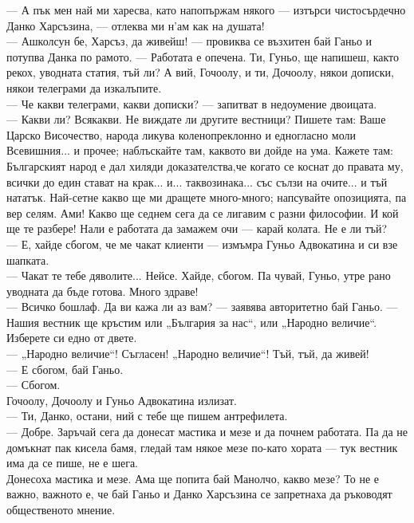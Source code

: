 \documentclass[12pt,a4paper]{article}
\begin{document}
    — А пък мен най ми харесва, като напопържам някого — изтърси чистосърдечно Данко Харсъзина, — отлеква ми н’ам как на душата!\\
    — Ашколсун бе, Харсъз, да живейш! — провиква се възхитен бай Ганьо и потупва Данка по рамото. — Работата е опечена. Ти, Гуньо, ще напишеш, както рекох, уводната статия, тъй ли? А вий, Гочоолу, и ти, Дочоолу, някои дописки, някои телеграми да изкалъпите.\\
    — Че какви телеграми, какви дописки? — запитват в недоумение двоицата.\\
    — Какви ли? Всякакви. Не виждате ли другите вестници? Пишете там: Ваше Царско Височество, народа ликува коленопреклонно и едногласно моли Всевишния... и прочее; наблъскайте там, каквото ви дойде на ума. Кажете там: Българският народ е дал хиляди доказателства,че когато се коснат до правата му, всички до един стават на крак... и... таквозинака... със сълзи на очите... и тъй нататък. Най-сетне какво ще ми дращете много-много; напсувайте опозицията, па вер селям. Ами! Какво ще седнем сега да се лигавим с разни философии. И кой ще те разбере! Нали е работата да замажем очи — карай колата. Не е ли тъй?\\
    — Е, хайде сбогом, че ме чакат клиенти — измъмра Гуньо Адвокатина и си взе шапката.\\
    — Чакат те тебе дяволите... Нейсе. Хайде, сбогом. Па чувай, Гуньо, утре рано уводната да бъде готова. Много здраве!\\
    — Всичко бошлаф. Да ви кажа ли аз вам? — заявява авторитетно бай Ганьо. — Нашия вестник ще кръстим или   „България за нас“, или „Народно величие“. Изберете си едно от двете.\\
    — „Народно величие“! Съгласен! „Народно величие“! Тъй, тъй, да живей!\\
    — Е сбогом, бай Ганьо.\\
    — Сбогом.\\
Гочоолу, Дочоолу и Гуньо Адвокатина излизат.\\
    — Ти, Данко, остани, ний с тебе ще пишем антрефилета.\\
    — Добре. Заръчай сега да донесат мастика и мезе и да почнем работата. Па да не домъкнат пак кисела бамя, гледай там някое мезе по-като хората — тук вестник има да се пише, не е шега.\\
Донесоха мастика и мезе. Ама ще попита бай Манолчо, какво мезе? То не е важно, важното е, че бай Ганьо и Данко Харсъзина се запретнаха да ръководят общественото мнение.\\
\end{document}
